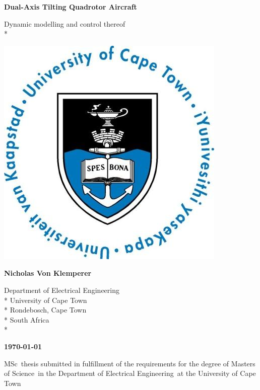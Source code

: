 \documentclass[a4paper, 11pt, oneside, openright, parskip=full]{book}
\newcommand{\auth}{Nicholas Von Klemperer}								%
\newcommand{\titl}{Dual-Axis Tilting Quadrotor Aircraft}						%
\newcommand{\subtitle}{Dynamic modelling and control thereof}						%
\newcommand{\dept}{Department of Electrical Engineering}%
\newcommand{\uni}{University of Cape Town}				%
\newcommand{\city}{Rondebosch, Cape Town}				%
\newcommand{\country}{South Africa}						%
\newcommand{\degre}{Masters of Science}				%
\newcommand{\degreeabv}{MSc}							%
\newcommand{\supervisor}{Supervisor}					%
\newcommand{\logo}										%
{	
	\includegraphics[scale = 0.3]{figs/uctLogo}
}
\begin{document}
\setcounter{MaxMatrixCols}{20}
\begin{titlepage}
	\centering
	\vspace*{1cm}

	\begin{Huge}					
		\bfseries\titl\par
		\vskip 5mm
	\end{Huge}
	\begin{Large}					
		\subtitle\\*
		\vskip 3cm
	\end{Large}
	\logo							
	\vskip 1.5cm	
	\begin{Large}					
		\bfseries\auth\\
	\end{Large}
	\begin{normalsize}				
		\vskip 2mm	
		\dept\\*
		\uni\\*
		\city\\*
		\country\\*
		
		\vskip 15mm	
	\end{normalsize}
	\begin{Large}					
		{\bfseries \mydate\today}
		\vskip 15mm	
	\end{Large}
		\degreeabv\ thesis submitted in fulfillment of the requirements for the degree of \degre\ in the \dept\ at the \uni
		

\end{titlepage}
\end{document}
